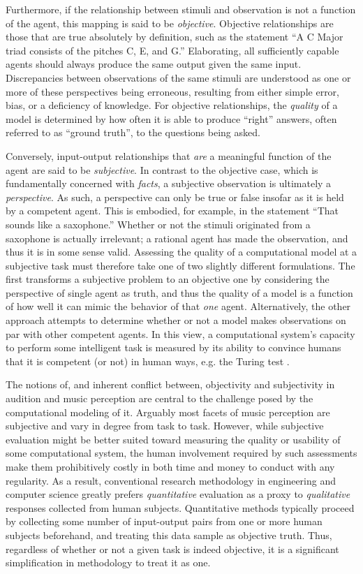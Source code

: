 Furthermore, if the relationship between stimuli and observation is not a function of the agent, this mapping is said to be \emph{objective}.
Objective relationships are those that are true absolutely by definition, such as the statement ``A C Major triad consists of the pitches C, E, and G.''
Elaborating, all sufficiently capable agents should always produce the same output given the same input.
Discrepancies between observations of the same stimuli are understood as one or more of these perspectives being erroneous, resulting from either simple error, bias, or a deficiency of knowledge.
For objective relationships, the \emph{quality} of a model is determined by how often it is able to produce ``right'' answers, often referred to as ``ground truth'', to the questions being asked.

Conversely, input-output relationships that \emph{are} a meaningful function of the agent are said to be \emph{subjective}.
In contrast to the objective case, which is fundamentally concerned with \emph{facts}, a subjective observation is ultimately a \emph{perspective}.
As such, a perspective can only be true or false insofar as it is held by a competent agent.
This is embodied, for example, in the statement ``That sounds like a saxophone.''
Whether or not the stimuli originated from a saxophone is actually irrelevant;
a rational agent has made the observation, and thus it is in some sense valid.
Assessing the quality of a computational model at a subjective task must therefore take one of two slightly different formulations.
The first transforms a subjective problem to an objective one by considering the perspective of single agent as truth, and thus the quality of a model is a function of how well it can mimic the behavior of that \emph{one} agent.
Alternatively, the other approach attempts to determine whether or not a model makes observations on par with other competent agents. %
In this view, a computational system's capacity to perform some intelligent task is measured by its ability to convince humans that it is competent (or not) in human ways, e.g. the Turing test \cite{Turing1950Computing}.

The notions of, and inherent conflict between, objectivity and subjectivity in audition and music perception are central to the challenge posed by the computational modeling of it.
Arguably most facets of music perception are subjective and vary in degree from task to task.
However, while subjective evaluation might be better suited toward measuring the quality or usability of some computational system, the human involvement required by such assessments make them prohibitively costly in both time and money to conduct with any regularity.
As a result, conventional research methodology in engineering and computer science greatly prefers \emph{quantitative} evaluation as a proxy to \emph{qualitative} responses collected from human subjects.
Quantitative methods typically proceed by collecting some number of input-output pairs from one or more human subjects beforehand, and treating this data sample as objective truth.
Thus, regardless of whether or not a given task is indeed objective, it is a significant simplification in methodology to treat it as one.


